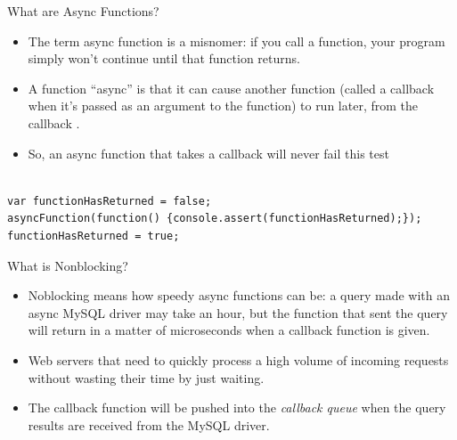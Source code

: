 \begin{frame}[fragile]{What are Async Functions?}

\begin{itemize}
	\item The term async function is a misnomer: if you call a function, your program simply won't continue until that function returns.
	\item A function ``async'' is that it can cause another function (called a callback when it's passed as an argument to the function) to run later, from the callback . 
	\item So, an async function that takes a callback will never fail this test
\end{itemize}

\begin{Code}{}%
\begin{lstlisting}[firstnumber=1, label=glabels, xleftmargin=0pt, basicstyle=\scriptsize]% 

var functionHasReturned = false; 
asyncFunction(function() {console.assert(functionHasReturned);});
functionHasReturned = true;
\end{lstlisting}%
\end{Code}%
\end{frame}

\begin{frame}[fragile]{What is Nonblocking?}

\begin{itemize}
	\item Noblocking means how speedy async functions can be: a query made with an async MySQL driver may take an hour, but the function that sent the query will return in a matter of microseconds when a callback function is given.
	\item Web servers that need to quickly process a high volume of incoming requests without wasting their time by just waiting. 
	\item The callback function will be pushed into the \textit{callback queue} when the query results are received from the MySQL driver. 
\end{itemize}

\end{frame}